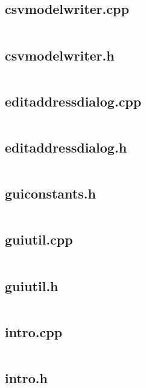 \documentclass{article}
\begin{document}
\subsection{csvmodelwriter.cpp}
\inputminted{cpp}{/home/dufferzafar/dev/@clones/bitcoin/src/qt/csvmodelwriter.cpp}
\newpage

\subsection{csvmodelwriter.h}
\inputminted{cpp}{/home/dufferzafar/dev/@clones/bitcoin/src/qt/csvmodelwriter.h}
\newpage

\subsection{editaddressdialog.cpp}
\inputminted{cpp}{/home/dufferzafar/dev/@clones/bitcoin/src/qt/editaddressdialog.cpp}
\newpage

\subsection{editaddressdialog.h}
\inputminted{cpp}{/home/dufferzafar/dev/@clones/bitcoin/src/qt/editaddressdialog.h}
\newpage

\subsection{guiconstants.h}
\inputminted{cpp}{/home/dufferzafar/dev/@clones/bitcoin/src/qt/guiconstants.h}
\newpage

\subsection{guiutil.cpp}
\inputminted{cpp}{/home/dufferzafar/dev/@clones/bitcoin/src/qt/guiutil.cpp}
\newpage

\subsection{guiutil.h}
\inputminted{cpp}{/home/dufferzafar/dev/@clones/bitcoin/src/qt/guiutil.h}
\newpage

\subsection{intro.cpp}
\inputminted{cpp}{/home/dufferzafar/dev/@clones/bitcoin/src/qt/intro.cpp}
\newpage

\subsection{intro.h}
\inputminted{cpp}{/home/dufferzafar/dev/@clones/bitcoin/src/qt/intro.h}
\newpage
\end{document}
